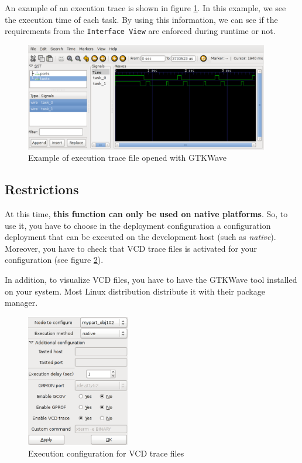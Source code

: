 \documentclass[11pt]{book}
\begin{document}
   An example of an execution trace is shown in figure
   \ref{figure-gtkwave-example}. In this example, we see the execution time of
   each task. By using this information, we can see if the requirements from the
   \texttt{Interface View} are enforced during runtime or not.

   \begin{figure}[!h]
   \centering
   \includegraphics[width=0.95\textwidth]{imgs/gtkwave}
   \caption{Example of execution trace file opened with GTKWave} 
   \label{figure-gtkwave-example}
   \end{figure}

      \subsection{Restrictions}
      \label{vcd-restrictions}
      At this time, \textbf{this function can only be used on native platforms}.
      So, to use it, you have to choose in the deployment configuration a
      configuration deployment that can be executed on the development host
      (such as \textit{native}). Moreover, you have to check that VCD trace
      files is activated for your configuration (see figure
      \ref{tastegui-vcd-activated}).

      In addition, to visualize VCD files, you have to have the GTKWave tool
      installed on your system. Most Linux distribution distribute it with their
      package manager.





\begin{figure}[!h]
\centering
\includegraphics[width=0.40\textwidth]{imgs/tastegui-vcd-conf}
\caption{Execution configuration for VCD trace files}
\label{tastegui-vcd-activated}
\end{figure}
\end{document}
